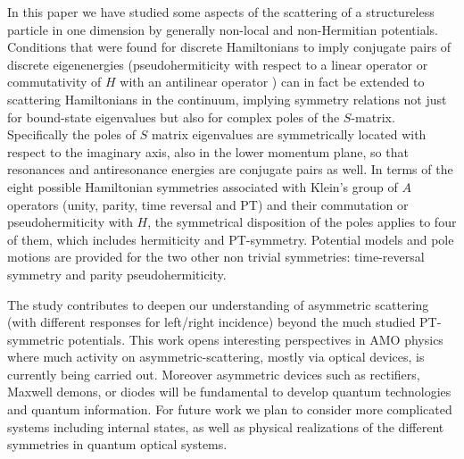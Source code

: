 In this paper we have studied some aspects of the scattering of a structureless particle in one dimension by
generally non-local and non-Hermitian potentials.
Conditions that were found for discrete Hamiltonians to imply conjugate pairs of discrete eigenenergies
(pseudohermiticity with respect to a linear operator or commutativity of $H$ with an antilinear operator \cite{Mostafazadeh2002,Mostafazadeh2002a,Mostafazadeh2002b}) can in fact be extended to scattering Hamiltonians in the continuum, implying symmetry relations not just for bound-state eigenvalues
but also for complex
poles of the $S$-matrix. Specifically the poles of $S$ matrix eigenvalues
are symmetrically located with respect to the imaginary axis, also in the lower momentum plane, so that resonances and antiresonance
energies are conjugate pairs as well.
In  terms of the eight possible Hamiltonian symmetries associated with Klein's group of $A$ operators (unity, parity, time reversal and PT)
and their commutation or pseudohermiticity with $H$,
the symmetrical disposition of the poles applies to four of them, which includes hermiticity and PT-symmetry. Potential models
and pole motions are provided for the
two other non trivial symmetries: time-reversal symmetry and parity pseudohermiticity.

The study contributes to deepen our  understanding of asymmetric scattering  (with different responses for left/right incidence) beyond the
much studied  PT-symmetric potentials. This work opens interesting perspectives in AMO physics where much activity on asymmetric-scattering, mostly via optical devices,   is currently being carried out. Moreover asymmetric devices such as rectifiers, Maxwell demons, or diodes will be fundamental to  develop quantum technologies and quantum information. For future work we plan to consider more complicated systems including internal states, as well as physical realizations of the different symmetries in quantum optical systems.
